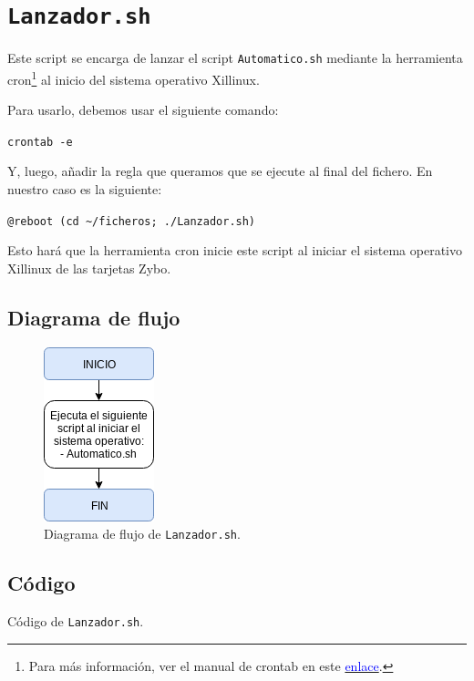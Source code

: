 \section{\texttt{Lanzador.sh}}
\hypertarget{ScriptLanzador}{}
Este script se encarga de lanzar el script \texttt{Automatico.sh} mediante la herramienta cron\footnote{Para más información, ver el manual de crontab en este \href{https://linux.die.net/man/5/crontab}{\textcolor{blue}{enlace}}.} al inicio del sistema operativo Xillinux.

Para usarlo, debemos usar el siguiente comando:
\begin{center}
	\texttt{crontab -e}
\end{center}

Y, luego, añadir la regla que queramos que se ejecute al final del fichero. En nuestro caso es la siguiente:
\begin{center}
	\texttt{@reboot (cd \textasciitilde/ficheros; ./Lanzador.sh)}
\end{center}

Esto hará que la herramienta cron inicie este script al iniciar el sistema operativo Xillinux de las tarjetas Zybo.

\newpage
\subsection{Diagrama de flujo}
\begin{figure}[h]
	\centering
	\includegraphics[scale=0.9]{Anexos/Anexo3/Diagramas/Lanzador.png}
	\caption{Diagrama de flujo de \texttt{Lanzador.sh}.}
	\label{Diagrama de flujo de Lanzador.sh}
\end{figure}

\subsection{Código}

\begin{center}
	Código de \texttt{Lanzador.sh}.
\end{center}


